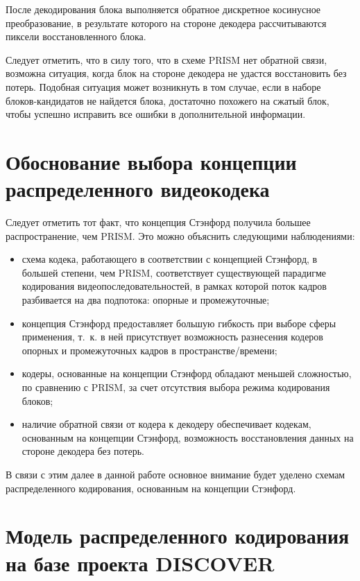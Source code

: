 После декодирования блока выполняется обратное дискретное косинусное преобразование, в результате которого на стороне декодера рассчитываются пиксели восстановленного блока.

Следует отметить, что в силу того, что в схеме PRISM нет обратной связи, возможна ситуация, когда блок на стороне декодера не удастся восстановить без потерь. Подобная ситуация может возникнуть в том случае, если в наборе блоков-кандидатов не найдется блока, достаточно похожего на сжатый блок, чтобы успешно исправить все ошибки в дополнительной информации.

\section{Обоснование выбора концепции распределенного видеокодека}

Следует отметить тот факт, что концепция Стэнфорд получила большее распространение, чем PRISM. Это можно объяснить следующими наблюдениями:
\begin{itemize}
    \item схема кодека, работающего в соответствии с концепцией Стэнфорд, в большей степени, чем PRISM, соответствует существующей парадигме кодирования видеопоследовательностей, в рамках которой поток кадров разбивается на два подпотока: опорные и промежуточные;
    \item концепция Стэнфорд предоставляет большую гибкость при выборе сферы применения, т.~к. в ней присутствует возможность разнесения кодеров опорных и промежуточных кадров в пространстве/времени;
    \item кодеры, основанные на концепции Стэнфорд обладают меньшей сложностью, по сравнению с PRISM, за счет отсутствия выбора режима кодирования блоков;
    \item наличие обратной связи от кодера к декодеру обеспечивает кодекам, основанным на концепции Стэнфорд, возможность восстановления данных на стороне декодера без потерь.
\end{itemize}

В связи с этим далее в данной работе основное внимание будет уделено схемам распределенного кодирования, основанным на концепции Стэнфорд.


\section{Модель распределенного кодирования на базе проекта DISCOVER}
\label{chap1:5}

